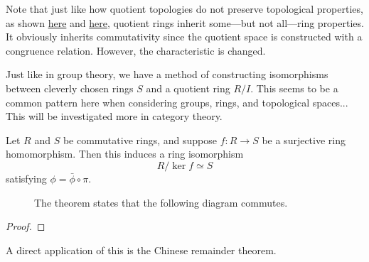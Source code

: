   Note that just like how quotient topologies do not preserve topological properties, as shown \hyperref[pst-ex:quotient_trivial]{here} and \hyperref[pst-ex:quotient_hausdorff]{here}, quotient rings inherit some---but not all---ring properties. It obviously inherits commutativity since the quotient space is constructed with a congruence relation. However, the characteristic is changed. 

  Just like in group theory, we have a method of constructing isomorphisms between cleverly chosen rings $S$ and a quotient ring $R/I$. This seems to be a common pattern here when considering groups, rings, and topological spaces... This will be investigated more in category theory. 

  \begin{theorem}
    \label{thm:first-isomorphism-theorem-for-rings}
    Let $R$ and $S$ be commutative rings, and suppose $f: R \rightarrow S$ be a surjective ring homomorphism. Then this induces a ring isomorphism
    \begin{equation}
      R /\ker{f} \simeq S
    \end{equation} 
    satisfying $\phi = \bar{\phi} \circ \pi$. 

    \begin{figure}[H]
      \centering 
      \caption{The theorem states that the following diagram commutes. } 
      \label{fig:fund_ring_homo_theorem}
    \end{figure}
  \end{theorem}
  \begin{proof}
    
  \end{proof} 

  A direct application of this is the Chinese remainder theorem. 


